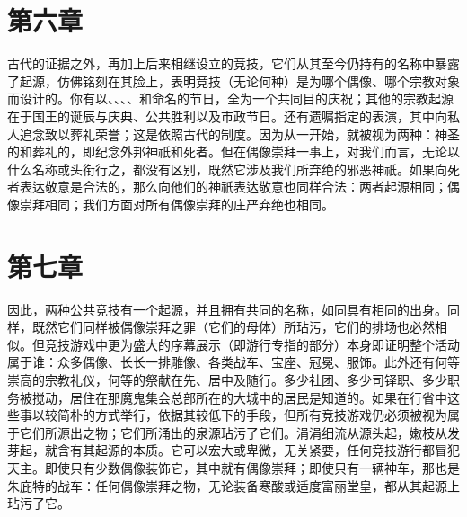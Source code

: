 
\section{第六章}

古代的证据之外，再加上后来相继设立的竞技，它们从其至今仍持有的名称中暴露了起源，仿佛铭刻在其脸上，表明竞技（无论何种）是为哪个偶像、哪个宗教对象而设计的。你有以、、、、和命名的节日，全为一个共同目的庆祝；其他的宗教起源在于国王的诞辰与庆典、公共胜利以及市政节日。还有遗嘱指定的表演，其中向私人追念致以葬礼荣誉；这是依照古代的制度。因为从一开始，就被视为两种：神圣的和葬礼的，即纪念外邦神祇和死者。但在偶像崇拜一事上，对我们而言，无论以什么名称或头衔行之，都没有区别，既然它涉及我们所弃绝的邪恶神祇。如果向死者表达敬意是合法的，那么向他们的神祇表达敬意也同样合法：两者起源相同；偶像崇拜相同；我们方面对所有偶像崇拜的庄严弃绝也相同。\par


\section{第七章}

因此，两种公共竞技有一个起源，并且拥有共同的名称，如同具有相同的出身。同样，既然它们同样被偶像崇拜之罪（它们的母体）所玷污，它们的排场也必然相似。但竞技游戏中更为盛大的序幕展示（即游行专指的部分）本身即证明整个活动属于谁：众多偶像、长长一排雕像、各类战车、宝座、冠冕、服饰。此外还有何等崇高的宗教礼仪，何等的祭献在先、居中及随行。多少社团、多少司铎职、多少职务被搅动，居住在那魔鬼集会总部所在的大城中的居民是知道的。如果在行省中这些事以较简朴的方式举行，依据其较低下的手段，但所有竞技游戏仍必须被视为属于它们所源出之物；它们所涌出的泉源玷污了它们。涓涓细流从源头起，嫩枝从发芽起，就含有其起源的本质。它可以宏大或卑微，无关紧要，任何竞技游行都冒犯天主。即使只有少数偶像装饰它，其中就有偶像崇拜；即使只有一辆神车，那也是朱庇特的战车：任何偶像崇拜之物，无论装备寒酸或适度富丽堂皇，都从其起源上玷污了它。\par


